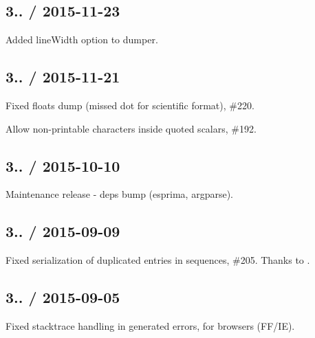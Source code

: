 \subsection*{3.. / 2015-\/11-\/23 }


\begin{DoxyItemize}
\item Added {\ttfamily line\+Width} option to dumper.
\end{DoxyItemize}

\subsection*{3.. / 2015-\/11-\/21 }


\begin{DoxyItemize}
\item Fixed floats dump (missed dot for scientific format), \#220.
\item Allow non-\/printable characters inside quoted scalars, \#192.
\end{DoxyItemize}

\subsection*{3.. / 2015-\/10-\/10 }


\begin{DoxyItemize}
\item Maintenance release -\/ deps bump (esprima, argparse).
\end{DoxyItemize}

\subsection*{3.. / 2015-\/09-\/09 }


\begin{DoxyItemize}
\item Fixed serialization of duplicated entries in sequences, \#205. Thanks to .
\end{DoxyItemize}

\subsection*{3.. / 2015-\/09-\/05 }


\begin{DoxyItemize}
\item Fixed stacktrace handling in generated errors, for browsers (F\+F/\+IE).
\end{DoxyItemize}

